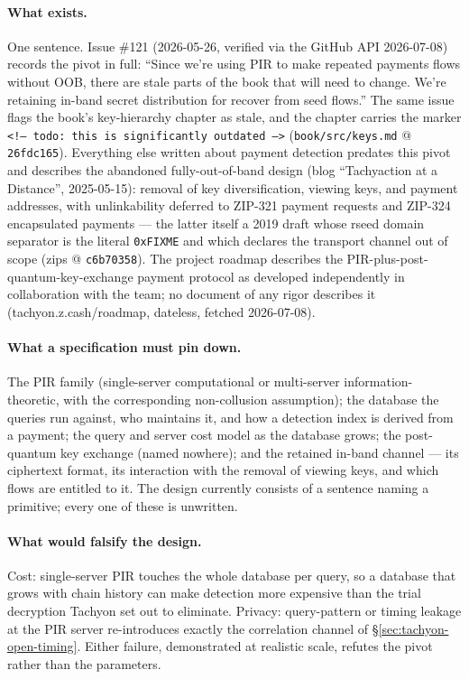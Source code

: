\documentclass[11pt,a4paper]{article}
\theoremstyle{definition}
\begin{document}
\paragraph{What exists.} One sentence. Issue \#121 (2026-05-26, verified via
the GitHub API 2026-07-08) records the pivot in full: ``Since we're using
PIR to make repeated payments flows without OOB, there are stale parts of
the book that will need to change. We're retaining in-band secret
distribution for recover from seed flows.'' The same issue flags the book's
key-hierarchy chapter as stale, and the chapter carries the marker
\texttt{<!--\ todo: this is significantly outdated -->}
(\texttt{book/src/keys.md} @ \texttt{26fdc165}). Everything else written
about payment detection predates this pivot and describes the abandoned
fully-out-of-band design (blog ``Tachyaction at a Distance'', 2025-05-15):
removal of key diversification, viewing keys, and payment addresses, with
unlinkability deferred to ZIP-321 payment requests and ZIP-324 encapsulated
payments --- the latter itself a 2019 draft whose rseed domain separator is
the literal \texttt{0xFIXME} and which declares the transport channel out of
scope (\textsf{zips} @ \texttt{c6b70358}). The project roadmap describes the
PIR-plus-post-quantum-key-exchange payment protocol as developed
independently in collaboration with the team; no document of any rigor
describes it (tachyon.z.cash/roadmap, dateless, fetched 2026-07-08).

\paragraph{What a specification must pin down.} The PIR family
(single-server computational or multi-server information-theoretic, with
the corresponding non-collusion assumption); the database the queries run
against, who maintains it, and how a detection index is derived from a
payment; the query and server cost model as the database grows; the
post-quantum key exchange (named nowhere); and the retained in-band channel
--- its ciphertext format, its interaction with the removal of viewing keys,
and which flows are entitled to it. The design currently consists of a
sentence naming a primitive; every one of these is unwritten.

\paragraph{What would falsify the design.} Cost: single-server PIR touches
the whole database per query, so a database that grows with chain history
can make detection more expensive than the trial decryption Tachyon set out
to eliminate. Privacy: query-pattern or timing leakage at the PIR server
re-introduces exactly the correlation channel of
\S\ref{sec:tachyon-open-timing}. Either failure, demonstrated at realistic
scale, refutes the pivot rather than the parameters.
\end{document}
